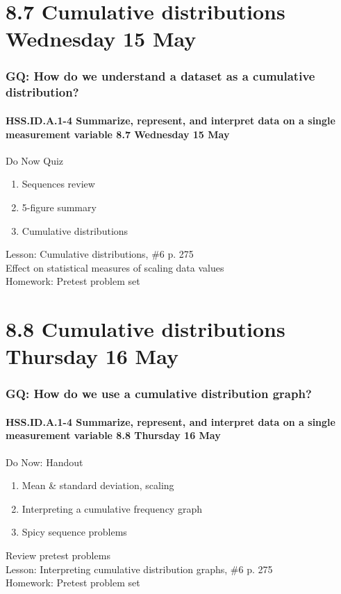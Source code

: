 \documentclass{beamer}
\begin{document}
\section{8.7 Cumulative distributions Wednesday 15 May}
  \frame
  {
    \frametitle{GQ: How do we understand a dataset as a cumulative distribution?}
    \framesubtitle{HSS.ID.A.1-4 Summarize, represent, and interpret data on a single measurement variable \hfill \alert{8.7 Wednesday 15 May}}

    \begin{block}{Do Now Quiz}
        \begin{enumerate}
          \item Sequences review
          \item 5-figure summary
          \item Cumulative distributions
      \end{enumerate}
    \end{block}
    Lesson: Cumulative distributions, \#6 p. 275\\
    Effect on statistical measures of scaling data values\\[0.5cm]
    Homework: Pretest problem set
  }

\section{8.8 Cumulative distributions Thursday 16 May}
  \frame
  {
    \frametitle{GQ: How do we use a cumulative distribution graph?}
    \framesubtitle{HSS.ID.A.1-4 Summarize, represent, and interpret data on a single measurement variable \hfill \alert{8.8 Thursday 16 May}}

    \begin{block}{Do Now: Handout}
        \begin{enumerate}
          \item Mean \& standard deviation, scaling
          \item Interpreting a cumulative frequency graph
          \item Spicy sequence problems
      \end{enumerate}
    \end{block}
    Review pretest problems\\
    Lesson: Interpreting cumulative distribution graphs, \#6 p. 275\\
    Homework: Pretest problem set
  }
\end{document}
